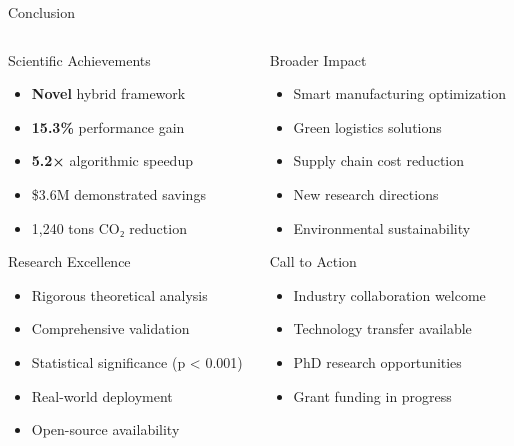 \documentclass[aspectratio=169,12pt]{beamer}
\newcommand{\highlight}[1]{\textcolor{alert}{\textbf{#1}}}
\newcommand{\performance}[1]{\textcolor{secondary}{\textbf{#1}}}
\newcommand{\technical}[1]{\textcolor{primary}{\textbf{#1}}}
\begin{document}
\begin{frame}{Conclusion}
\begin{columns}[T]
\begin{column}{0.5\textwidth}
\vspace{-0.4cm}
\begin{exampleblock}{Scientific Achievements}
\begin{itemize}
    \item \highlight{Novel} hybrid framework
    \item \performance{15.3\%} performance gain
    \item \technical{5.2×} algorithmic speedup
    \item \$3.6M demonstrated savings
    \item 1,240 tons CO₂ reduction
\end{itemize}
\end{exampleblock}

\vspace{-0.3cm}
\begin{block}{Research Excellence}
\begin{itemize}
    \item Rigorous theoretical analysis
    \item Comprehensive validation
    \item Statistical significance (p < 0.001)
    \item Real-world deployment
    \item Open-source availability
\end{itemize}
\end{block}
\end{column}
\begin{column}{0.5\textwidth}
\vspace{-0.4cm}
\begin{block}{Broader Impact}
\begin{itemize}
    \item Smart manufacturing optimization
    \item Green logistics solutions
    \item Supply chain cost reduction
    \item New research directions
    \item Environmental sustainability
\end{itemize}
\end{block}

\vspace{-0.3cm}
\begin{alertblock}{Call to Action}
\begin{itemize}
    \item Industry collaboration welcome
    \item Technology transfer available
    \item PhD research opportunities
    \item Grant funding in progress
\end{itemize}
\end{alertblock}
\end{column}
\end{columns}


\end{frame}
\end{document}
